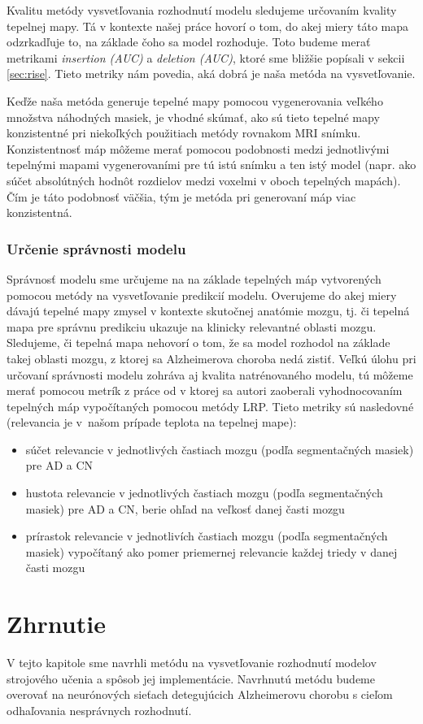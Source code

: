 Kvalitu metódy vysvetľovania rozhodnutí modelu sledujeme určovaním kvality tepelnej mapy. Tá v kontexte našej práce hovorí o tom, do akej miery táto mapa odzrkadľuje to, na základe čoho sa model rozhoduje. Toto budeme merať metrikami \textit{insertion (AUC)} a \textit{deletion (AUC)}, ktoré sme bližšie popísali v sekcii \ref{sec:rise}. Tieto metriky nám povedia, aká dobrá je naša metóda na vysvetľovanie.

Keďže naša metóda generuje tepelné mapy pomocou vygenerovania veľkého množstva náhodných masiek, je vhodné skúmať, ako sú tieto tepelné mapy konzistentné pri niekoľkých použitiach metódy rovnakom MRI snímku. Konzistentnosť máp môžeme merať pomocou podobnosti medzi jednotlivými tepelnými mapami vygenerovaními pre tú istú snímku a ten istý model (napr. ako súčet absolútných hodnôt rozdielov medzi voxelmi v oboch tepelných mapách). Čím je táto podobnosť väčšia, tým je metóda pri generovaní máp viac konzistentná.

\subsubsection{Určenie správnosti modelu \label{sec:heat_maps_and_model_segmentation_masks}}

Správnosť modelu sme určujeme na na základe tepelných máp vytvorených pomocou metódy na vysvetľovanie predikcií modelu. Overujeme do akej miery dávajú tepelné mapy zmysel v kontexte skutočnej anatómie mozgu, tj. či tepelná mapa pre správnu predikciu ukazuje na klinicky relevantné oblasti mozgu. Sledujeme, či tepelná mapa nehovorí o tom, že sa model rozhodol na základe takej oblasti mozgu, z ktorej sa Alzheimerova choroba nedá zistiť. Veľkú úlohu pri určovaní správnosti modelu zohráva aj kvalita natrénovaného modelu, tú môžeme merať pomocou metrík z práce od \citeauthor*{bohle2019layer} v ktorej sa autori zaoberali vyhodnocovaním tepelných máp vypočítaných pomocou metódy LRP. Tieto metriky sú nasledovné (relevancia je v našom prípade teplota na tepelnej mape):

\begin{itemize}
    \item súčet relevancie v jednotlivých častiach mozgu (podľa segmentačných masiek) pre AD a CN
    \item hustota relevancie v jednotlivých častiach mozgu (podľa segmentačných masiek) pre AD a CN, berie ohľad na veľkosť danej časti mozgu
    \item prírastok relevancie v jednotlivích častiach mozgu (podľa segmentačných masiek) vypočítaný ako pomer priemernej relevancie každej triedy v danej časti mozgu
\end{itemize}

\section{Zhrnutie}

V tejto kapitole sme navrhli metódu na vysvetľovanie rozhodnutí modelov strojového učenia a spôsob jej implementácie. Navrhnutú metódu budeme overovať na neurónových sieťach detegujúcich Alzheimerovu chorobu s cieľom odhaľovania nesprávnych rozhodnutí.
